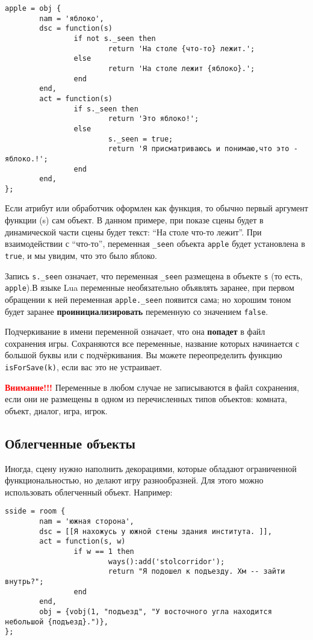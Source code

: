 \documentclass[a4paper,12pt]{article}
\begin{document}
\begin{verbatim}
apple = obj {
        nam = 'яблоко',
        dsc = function(s)
                if not s._seen then
                        return 'На столе {что-то} лежит.';
                else
                        return 'На столе лежит {яблоко}.';
                end
        end,
        act = function(s)
                if s._seen then
                        return 'Это яблоко!';
                else
                        s._seen = true;
                        return 'Я присматриваюсь и понимаю,что это - яблоко.!';
                end
        end,
};
\end{verbatim}

Если атрибут или обработчик оформлен как функция, то обычно первый аргумент функции (s) сам объект. В данном примере, при показе сцены будет в динамической части сцены будет текст: ``На столе что-то лежит''. При взаимодействии с ``что-то'', переменная \verb/_seen/ объекта \verb/apple/ будет установлена в \verb/true/, и мы увидим, что это было яблоко.

Запись \verb/s._seen/ означает, что переменная \verb/_seen/ размещена в объекте \verb/s/ (то есть, \verb/apple/).В языке Lua переменные необязательно объявлять заранее, при первом обращении к ней переменная \verb/apple._seen/ появится сама; но хорошим тоном будет заранее \textbf{проинициализировать} переменную со значением \verb/false/.

Подчеркивание в имени переменной означает, что она \textbf{попадет} в файл сохранения игры. Сохраняются все переменные, название которых начинается с большой буквы или с подчёркивания. Вы можете переопределить функцию \verb/isForSave(k)/, если вас это не устраивает.

\textbf{\textcolor{red}{Внимание!!!}} Переменные в любом случае не записываются в файл сохранения, если они не размещены в одном из перечисленных типов объектов: комната, объект, диалог, игра, игрок.

\subsection{Облегченные объекты}

Иногда, сцену нужно наполнить декорациями, которые обладают ограниченной функциональностью, но делают игру разнообразней. Для этого можно использовать облегченный объект. Например:

\begin{verbatim}
sside = room {
        nam = 'южная сторона',
        dsc = [[Я нахожусь у южной стены здания института. ]],
        act = function(s, w)
                if w == 1 then
                        ways():add('stolcorridor');
                        return "Я подошел к подъезду. Хм -- зайти внутрь?";
                end
        end,
        obj = {vobj(1, "подъезд", "У восточного угла находится небольшой {подъезд}.")},
};
\end{verbatim}
\end{document}
